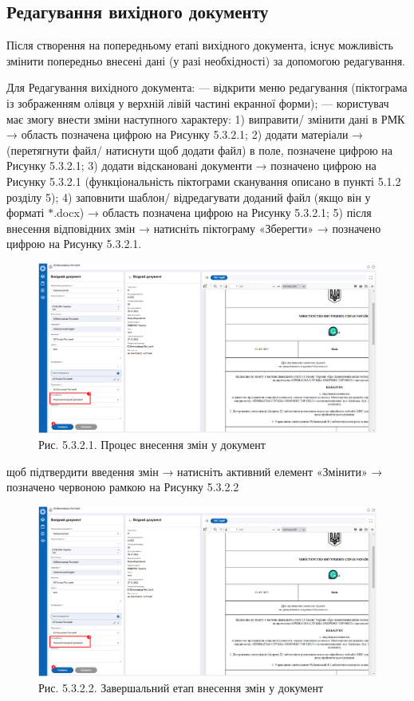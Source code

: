 \subsection{Редагування вихідного документу}

Після створення на попередньому етапі вихідного документа, існує
можливість змінити попередньо внесені дані (у разі необхідності) за допомогою
редагування.

Для Редагування вихідного документа:
--- відкрити меню редагування (піктограма із зображенням олівця у верхній лівій частині екранної форми);
--- користувач має змогу внести зміни наступного характеру:
1) виправити/ змінити дані в РМК → область позначена цифрою  на Рисунку 5.3.2.1;
2) додати матеріали → (перетягнути файл/ натиснути щоб додати файл) в поле, позначене цифрою  на Рисунку 5.3.2.1;
3) додати відскановані документи → позначено цифрою  на Рисунку 5.3.2.1 (функціональність піктограми сканування описано в пункті 5.1.2 розділу 5);
4) заповнити шаблон/ відредагувати доданий файл (якщо він у форматі $\ast$.docx) → область позначена цифрою  на Рисунку 5.3.2.1;
5) після внесення відповідних змін → натисніть піктограму «Зберегти» → позначено цифрою  на Рисунку 5.3.2.1.

\begin{figure}[!htbp]
\centerline{\includegraphics[width=\textwidth]{img/5.3.1.3.png}}
\caption{Рис. 5.3.2.1. Процес внесення змін у документ}
\end{figure}

щоб підтвердити введення змін → натисніть активний елемент «Змінити» → позначено червоною рамкою на Рисунку 5.3.2.2

\begin{figure}[!htbp]
\centerline{\includegraphics[width=\textwidth]{img/5.3.1.3.png}}
\caption{Рис. 5.3.2.2. Завершальний етап внесення змін у документ}
\end{figure}


